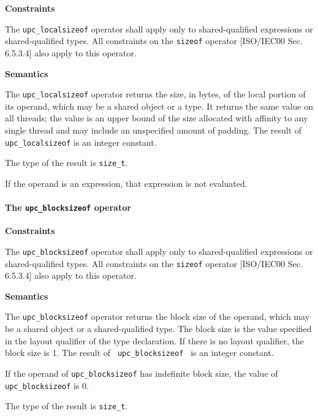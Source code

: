 {\bf Constraints} 

\npf The {\tt upc\_localsizeof} operator shall apply only to
     {shared-qualified expressions or
     shared-qualified types}.  All constraints on the {\tt sizeof} operator
     [ISO/IEC00 Sec. 6.5.3.4] also apply to this operator.

{\bf Semantics} 

\np The {\tt upc\_localsizeof} operator returns the size, in
     bytes, of the local portion of its operand, which may be a shared
     object or a  type. 
     It returns the same value on
     all threads; the value is an upper bound of the size allocated with
     affinity to any single thread and may include an unspecified amount of
     padding.  The result of {\tt upc\_localsizeof} is an integer constant.

\np The type of the result is {\tt size\_t}. 

\np If the operand is an expression, that expression
     is not evaluated.

\paragraph{The {\tt\bf upc\_blocksizeof} operator}
 

{\bf Constraints} 

\npf The {\tt upc\_blocksizeof} operator shall apply only to
     {shared-qualified expressions or shared-qualified types}.
     All constraints on the {\tt sizeof} operator
     [ISO/IEC00 Sec. 6.5.3.4] also apply to this operator.

{\bf Semantics} 

\np The {\tt upc\_blocksizeof} operator returns the block
     size of 
     {the operand, which may be a shared object or a shared-qualified type}.
     The block size is the value specified in
     the layout qualifier of the type declaration. If there is no
     layout qualifier, the block size is 1.  The result of {\tt
     upc\_blocksizeof } is an integer constant.

\np If the operand of {\tt upc\_blocksizeof} has indefinite
     block size, the value of {\tt upc\_blocksizeof} is 0.

\np The type of the result is {\tt size\_t}. 

